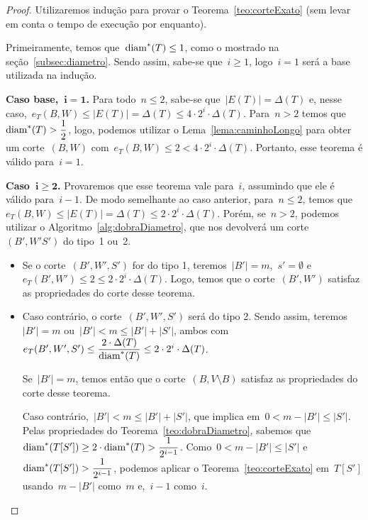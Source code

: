 	\medskip
	\medskip

	\begin{proof}
		Utilizaremos indução para provar o 
		Teorema~\ref{teo:corteExato} 
		(sem levar em conta o tempo de execução por enquanto).
		
		Primeiramente, temos que~${\mathrm{diam}^*(T)\le1}$, como o mostrado 
		na seção~\ref{subsec:diametro}. 
		Sendo assim, sabe-se que~${i\ge1}$, logo~${i=1}$ será a base 
		utilizada na indução.
		
		\textbf{Caso base,~${\mathbf {i=1}}$.}
		Para todo~${n\le 2}$, sabe-se que~${|E(T)|=\Delta(T)}$ e, nesse
		caso,~${e_T(B,W)\le |E(T)|=\Delta(T)\le 4\cdot 2^i\cdot 
		\Delta(T)}$.
		Para~$n>2$ temos que~${\mathrm{diam}^*(T)>\dfrac{1}{2}}$, logo, 
		podemos utilizar o Lema~\ref{lema:caminhoLongo} para obter 
		um corte~$(B,W)$ 
		com~${e_T(B,W)\le 2 < 4\cdot 2^i\cdot \Delta(T)}$.
		Portanto, esse teorema é válido para~${i=1}$.


		\textbf{Caso~${\mathbf{i\ge 2}}$.} Provaremos que esse teorema 
		vale para~$i$, assumindo que ele é válido para~$i-1$.
		De modo semelhante ao caso anterior, para~${n\le2}$, temos 
		que~${e_T(B,W)\le |E(T)|=\Delta(T)\le 2\cdot 2^i\cdot 
		\Delta(T)}$.
		Porém, se~${n>2}$, podemos utilizar o 
		Algoritmo~\ref{alg:dobraDiametro}, que nos devolverá um 
		corte~$(B',W'S')$ do tipo~1 ou~2.
		\begin{itemize}
			\item Se o corte~$(B',W',S')$ for do tipo 1, 
			teremos~${|B'|=m}$,~${s'=\emptyset}$
			e~${e_T(B',W')\le2\le 2\cdot 2^i\cdot \Delta(T)}$.
			Logo, temos que o corte~$(B',W')$ satisfaz as propriedades
			do corte desse teorema.

			\item Caso contrário, o corte~$(B',W',S')$ será do tipo 2. 
			Sendo assim, teremos~${|B'|=m}$ ou~${|B'|<m\le |B'|+|S'|}$, ambos
			com~${e_T(B',W',S')\le \dfrac{2\cdot\Delta(T)}{\mathrm{diam}^*(T)}\le
			2\cdot2^i\cdot\Delta(T)}$.
			
			Se~${|B'|=m}$, temos então que o corte~$(B,V\setminus B)$ satisfaz
			as propriedades do corte desse
			teorema.

			Caso contrário,~${|B'|<m\le |B'|+|S'|}$, que implica
			em~${0<m-|B'|\le|S'|}$. 
			Pelas propriedades do Teorema~\ref{teo:dobraDiametro}, 
			sabemos que~${\mathrm{diam}^*(T[S'])\ge 2\cdot \mathrm{diam}^*(T)>
			\dfrac{1}{2^{i-1}}}$.
			Como~${0<m-|B'|\le|S'|}$ 
			e~${\mathrm{diam}^*(T[S'])>\dfrac{1}{2^{i-1}}}$, podemos aplicar o 
			Teorema~\ref{teo:corteExato} em~$T[S']$ 
			usando~${m-|B'|}$ como~$m$ e,~$i-1$ como~$i$.
			

\end{itemize}
\end{proof}
